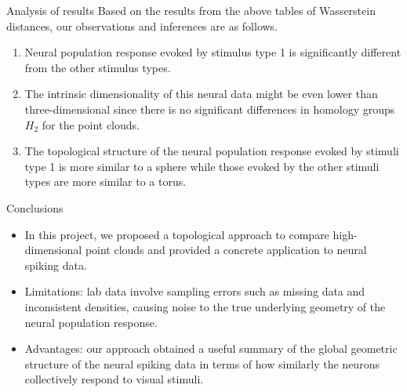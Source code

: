 \documentclass[xcolor={dvipsnames,svgnames}]{beamer}
\begin{document}
\begin{frame}{Analysis of results}
    Based on the results from the above tables of Wasserstein distances, our observations and inferences are as follows.

\begin{enumerate}
    \item Neural population response evoked by stimulus type 1 is significantly different from the other stimulus types. 
    
    \item The intrinsic dimensionality of this neural data might be even lower than three-dimensional since there is no significant differences in homology groups $H_2$ for the point clouds.
    
    \item The topological structure of the neural population response evoked by stimuli type 1 is more similar to a sphere while those evoked by the other stimuli types are more similar to a torus. 
    
\end{enumerate}
\end{frame}

\begin{frame}{Conclusions}
\begin{itemize}
    \item In this project, we proposed a topological approach to compare high-dimensional point clouds and provided a concrete application to neural spiking data. 
    \item Limitations: lab data involve sampling errors such as missing data and inconsistent densities, causing noise to the true underlying geometry of the neural population response.
    \item Advantages: our approach obtained a useful summary of the global geometric structure of the neural spiking data in terms of how similarly the neurons collectively respond to visual stimuli.
\end{itemize}
\end{frame}
\end{document}
